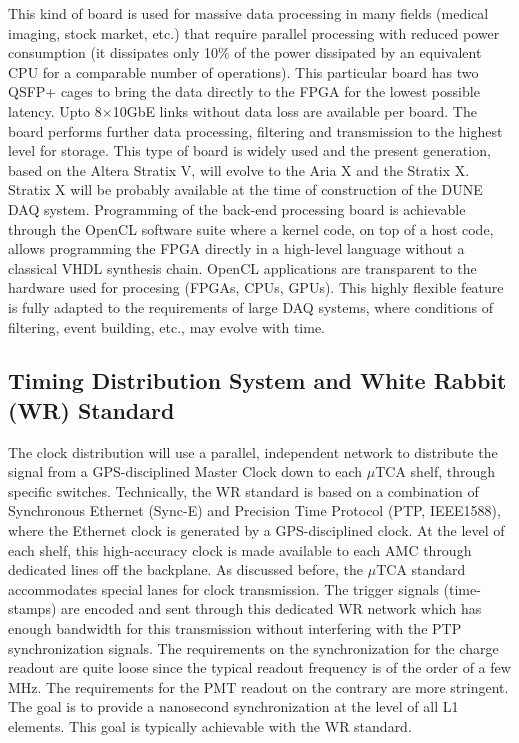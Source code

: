 This kind of board is used for massive data processing in many fields
(medical imaging, stock market, etc.) that require parallel
processing with reduced power consumption (it dissipates only 10\% of the power
dissipated by an equivalent CPU for a comparable number of
operations). This particular board has two QSFP+ cages to bring the
data directly to the FPGA for the lowest possible latency. Upto 8$\times$10GbE
links without data loss are available per board.  The board performs
further data processing, filtering and transmission to the highest
level for storage. This type of board is widely used and the present
generation, based on the Altera Stratix V, will evolve to the Aria X
and the Stratix X. Stratix X will be probably available at the time
of construction of the DUNE DAQ system. Programming of the back-end
processing board is achievable through the OpenCL software suite where
a kernel code, on top of a host code, allows programming  the FPGA directly in a
high-level language without a classical VHDL synthesis
chain. OpenCL applications are transparent to the hardware used for
procesing (FPGAs, CPUs, GPUs). This highly flexible feature is fully
adapted to the requirements of large DAQ systems, where conditions
of filtering, event building, etc., may evolve with time.
 
\subsection{Timing Distribution System and White Rabbit (WR) Standard}

The clock distribution will use a parallel, independent
network to distribute the signal from a GPS-disciplined Master Clock down to each $\mu$TCA
shelf, through specific switches. Technically, the WR standard is based
on a combination of Synchronous Ethernet (Sync-E) and Precision Time
Protocol (PTP, IEEE1588), where the Ethernet clock is generated by a
GPS-disciplined clock. At the level of each shelf, this high-accuracy
clock is made available to each AMC through dedicated lines off
the backplane. As discussed before, the $\mu$TCA standard accommodates
special lanes for clock transmission. The trigger signals
(time-stamps) are encoded and sent through this dedicated WR network
which has enough bandwidth for this transmission without interfering
with the PTP synchronization signals. The requirements on the
synchronization for the charge readout are quite loose since the
typical readout frequency is of the order of a few MHz. The
requirements for the PMT readout on the contrary are more
stringent. The goal is to provide a nanosecond synchronization at the
level of all L1 elements. This goal is typically achievable with the
WR standard\cite{WR-standard}.


